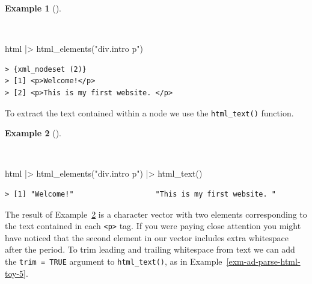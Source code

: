 \documentclass[
  letterpaper,
  DIV=11,
  numbers=noendperiod]{scrreport}
\newenvironment{Shaded}{\begin{snugshade}}{\end{snugshade}}
\newcommand{\FunctionTok}[1]{\textcolor[rgb]{0.00,0.00,0.00}{#1}}
\newcommand{\NormalTok}[1]{\textcolor[rgb]{0.00,0.00,0.00}{#1}}
\newcommand{\SpecialCharTok}[1]{\textcolor[rgb]{0.00,0.00,0.00}{#1}}
\newcommand{\StringTok}[1]{\textcolor[rgb]{0.00,0.00,0.00}{#1}}
\theoremstyle{definition}
\newtheorem{example}{Example}[chapter]
\theoremstyle{remark}
\begin{document}
\begin{example}[]\protect\hypertarget{exm-ad-parse-html-toy-3}{}\label{exm-ad-parse-html-toy-3}

~

\begin{Shaded}
\begin{Highlighting}[]
\NormalTok{html }\SpecialCharTok{|\textgreater{}}
  \FunctionTok{html\_elements}\NormalTok{(}\StringTok{"div.intro p"}\NormalTok{)}
\end{Highlighting}
\end{Shaded}

\begin{verbatim}
> {xml_nodeset (2)}
> [1] <p>Welcome!</p>
> [2] <p>This is my first website. </p>
\end{verbatim}

\end{example}

To extract the text contained within a node we use the
\texttt{html\_text()} function.

\begin{example}[]\protect\hypertarget{exm-ad-parse-html-toy-4}{}\label{exm-ad-parse-html-toy-4}

~

\begin{Shaded}
\begin{Highlighting}[]
\NormalTok{html }\SpecialCharTok{|\textgreater{}}
  \FunctionTok{html\_elements}\NormalTok{(}\StringTok{"div.intro p"}\NormalTok{) }\SpecialCharTok{|\textgreater{}}
  \FunctionTok{html\_text}\NormalTok{()}
\end{Highlighting}
\end{Shaded}

\begin{verbatim}
> [1] "Welcome!"                   "This is my first website. "
\end{verbatim}

\end{example}

The result of Example~\ref{exm-ad-parse-html-toy-4} is a character
vector with two elements corresponding to the text contained in each
\texttt{\textless{}p\textgreater{}} tag. If you were paying close
attention you might have noticed that the second element in our vector
includes extra whitespace after the period. To trim leading and trailing
whitespace from text we can add the \texttt{trim\ =\ TRUE} argument to
\texttt{html\_text()}, as in Example~\ref{exm-ad-parse-html-toy-5}.
\end{document}
